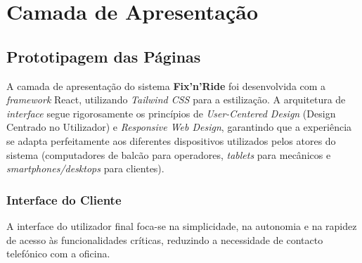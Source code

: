 \documentclass[a4paper,12pt]{scrreprt}
\begin{document}
\chapter{Camada de Apresentação}

\section{Prototipagem das Páginas}

A camada de apresentação do sistema \textbf{Fix'n'Ride} foi desenvolvida com a \textit{framework} React, utilizando \textit{Tailwind CSS} para a estilização. A arquitetura de \textit{interface} segue rigorosamente os princípios de \textit{User-Centered Design} (Design Centrado no Utilizador) e \textit{Responsive Web Design}, garantindo que a experiência se adapta perfeitamente aos diferentes dispositivos utilizados pelos atores do sistema (computadores de balcão para operadores, \textit{tablets} para mecânicos e \textit{smartphones/desktops} para clientes).

\subsection{Interface do Cliente}
\label{subsec:interface_cliente}

A interface do utilizador final foca-se na simplicidade, na autonomia e na rapidez de acesso às funcionalidades críticas, reduzindo a necessidade de contacto telefónico com a oficina.
\end{document}
